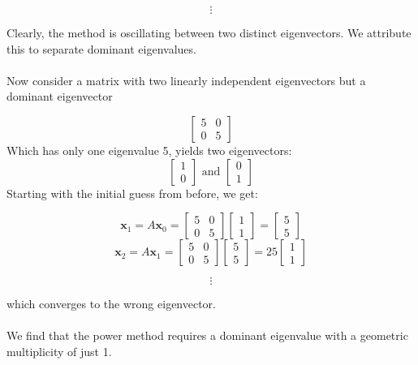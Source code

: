 \documentclass[letterpaper,12pt]{article}
\theoremstyle{definition}
\begin{document}
\[\vdots\]

Clearly, the method is oscillating between two distinct eigenvectors. We attribute this to separate dominant eigenvalues.\\\\
Now consider a matrix with two linearly independent eigenvectors but a dominant eigenvector

\[\begin{bmatrix}
5 & 0\\
0&5
\end {bmatrix}\]
Which has only one eigenvalue 5, yields two eigenvectors:
\[\begin{bmatrix}
1\\
0
\end {bmatrix} \text{ and }
\begin{bmatrix}
0\\
1
\end {bmatrix}\]
Starting with the initial guess from before, we get:

\[\textbf{x}_1=A\textbf{x}_0=
\begin{bmatrix}
5 & 0\\
0&5
\end{bmatrix}
\begin{bmatrix}
1\\
1
\end{bmatrix}=
\begin{bmatrix}
5\\
5
\end{bmatrix}
\]
\[\textbf{x}_2=A\textbf{x}_1=
\begin{bmatrix}
5 & 0\\
0&5
\end{bmatrix}
\begin{bmatrix}
5\\
5
\end{bmatrix}=25
\begin{bmatrix}
1\\
1
\end{bmatrix}
\]

\[\vdots\]

which converges to the wrong eigenvector.\\\\
We find that the power method requires a dominant eigenvalue with a geometric multiplicity of just 1.
\end{document}
